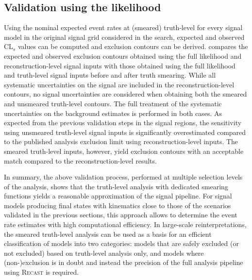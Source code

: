 \subsection{Validation using the likelihood}

Using the nominal expected event rates at (smeared) truth-level for every signal model in the original signal grid considered in the \onelepton search, expected and observed CL$_s$ values can be computed and exclusion contours can be derived.
 compares the expected and observed exclusion contours obtained using the full likelihood and reconstruction-level signal inputs with those obtained using the full likelihood and truth-level signal inputs before and after truth smearing.
While all systematic uncertainties on the signal are included in the reconstruction-level contours, no signal uncertainties are considered when obtaining both the smeared and unsmeared truth-level contours. The full treatment of the systematic uncertainties on the background estimates is performed in both cases.
As expected from the previous validation steps in the signal regions, the sensitivity using unsmeared truth-level signal inputs is significantly overestimated compared to the published analysis exclusion limit using reconstruction-level inputs.
The smeared truth-level inputs, however, yield exclusion contours with an acceptable match compared to the reconstruction-level results.

In summary, the above validation process, performed at multiple selection levels of the analysis, shows that the truth-level analysis with dedicated smearing functions yields a reasonable approximation of the signal pipeline.
For signal models producing final states with kinematics close to those of the scenarios validated in the previous sections, this approach allows to determine the event rate estimates with high computational efficiency.
In large-scale reinterpretations, the smeared truth-level analysis can be used as a basis for an efficient classification of models into two categories: models that are safely excluded (or not excluded) based on truth-level analysis only, and models where (non-)exclusion is in doubt and instead the precision of the full analysis pipeline using \textsc{Recast} is required.


